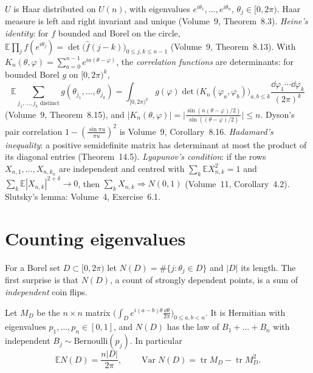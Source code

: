 \begin{reminder}
$U$ is Haar distributed on $U(n)$, with eigenvalues $e^{i\theta_1},\dots,e^{i\theta_n}$, $\theta_j\in[0,2\pi)$. Haar measure is left and right invariant and unique (Volume~9, Theorem~8.3). \emph{Heine's identity}: for $f$ bounded and
Borel on the circle, $\mathbb E\prod_jf(e^{i\theta_j})=\det\bigl(\hat f(j-k)\bigr)_{0\le j,k\le n-1}$ (Volume~9, Theorem~8.13). With $K_n(\theta,\varphi)=\sum_{a=0}^{n-1}e^{ia(\theta-\varphi)}$, the \emph{correlation functions} are determinants: for bounded Borel
$g$ on $[0,2\pi)^k$,
\[
\mathbb E\sum_{j_1,\dots,j_k\text{ distinct}}g(\theta_{j_1},\dots,\theta_{j_k})=\int_{[0,2\pi)^k}g(\varphi)\det\bigl(K_n(\varphi_a,\varphi_b)\bigr)_{a,b\le k}\frac{\dd\varphi_1\cdots\dd\varphi_k}{(2\pi)^k}
\]
(Volume~9, Theorem~8.15), and $|K_n(\theta,\varphi)|=\bigl|\frac{\sin(n(\theta-\varphi)/2)}{\sin((\theta-\varphi)/2)}\bigr|\le n$. Dyson's pair correlation $1-(\frac{\sin\pi u}{\pi u})^2$ is Volume~9, Corollary~8.16. \emph{Hadamard's inequality}: a positive semidefinite
matrix has determinant at most the product of its diagonal entries (Theorem~14.5). \emph{Lyapunov's condition}: if the rows $X_{n,1},\dots,X_{n,k_n}$ are independent and centred with $\sum_k\mathbb EX_{n,k}^2=1$ and
$\sum_k\mathbb E|X_{n,k}|^{2+\delta}\to0$, then $\sum_kX_{n,k}\Rightarrow N(0,1)$ (Volume~11, Corollary~4.2). Slutsky's lemma: Volume~4, Exercise~6.1.
\end{reminder}

\section{Counting eigenvalues}

For a Borel set $D\subset[0,2\pi)$ let $N(D)=\#\{j:\theta_j\in D\}$ and $|D|$ its length. The first surprise is that $N(D)$, a count of strongly dependent points, is a sum of \emph{independent} coin flips.

\begin{proposition}\label{prop:bernoulli}
Let $M_D$ be the $n\times n$ matrix $\bigl(\int_De^{i(a-b)\theta}\frac{\dd\theta}{2\pi}\bigr)_{0\le a,b<n}$. It is Hermitian with eigenvalues $p_1,\dots,p_n\in[0,1]$, and $N(D)$ has the law of $B_1+\dots+B_n$ with independent $B_j\sim\mathrm{Bernoulli}(p_j)$. In particular
\[
\mathbb EN(D)=\frac{n|D|}{2\pi},\qquad\operatorname{Var}N(D)=\operatorname{tr}M_D-\operatorname{tr}M_D^2.
\]
\end{proposition}

